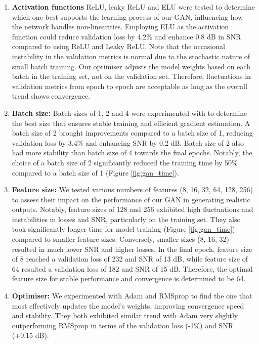 \begin{enumerate}
	\item \textbf{Activation functions} ReLU, leaky ReLU and ELU were tested to determine which one best supports the learning process of our GAN, influencing how the network handles non-linearities. Employing ELU as the activation function could reduce validation loss by 4.2\% and enhance 0.8 dB in SNR compared to using ReLU and Leaky ReLU. Note that the occasional instability in the validation metrics is normal due to the stochastic nature of small batch training. Our optimiser adjusts the model weights based on each batch in the training set, not on the validation set. Therefore, fluctuations in validation metrics from epoch to epoch are acceptable as long as the overall trend shows convergence.
	
	\item \textbf{Batch size:} Batch sizes of 1, 2 and 4 were experimented with to determine the best size that ensures stable training and efficient gradient estimation. A batch size of 2 brought improvements compared to a batch size of 1, reducing validation loss by 3.4\% and enhancing SNR by 0.2 dB. Batch size of 2 also had more stability than batch size of 4 towards the final epochs. Notably, the choice of a batch size of 2 significantly reduced the training time by 50\% compared to a batch size of 1 (Figure \ref{fig:gan_time}). 
	
	\item \textbf{Feature size:} We tested various numbers of features (8, 16, 32, 64, 128, 256) to assess their impact on the performance of our GAN in generating realistic outputs. Notably, feature sizes of 128 and 256 exhibited high fluctuations and instabilities in losses and SNR, particularly on the training set. They also took significantly longer time for model training (Figure \ref{fig:gan_time}) compared to smaller feature sizes. Conversely, smaller sizes (8, 16, 32) resulted in much lower SNR and higher losses. In the final epoch, feature size of 8 reached a validation loss of 232 and SNR of 13 dB, while feature size of 64 resulted a validation loss of 182 and SNR of 15 dB. Therefore, the optimal feature size for stable performance and convergence is determined to be 64.
	
	\item \textbf{Optimiser:} We experimented with Adam and RMSprop to find the one that most effectively updates the model's weights, improving convergence speed and stability. They both exhibited similar trend with Adam very slightly outperforming RMSprop in terms of the validation loss (-1\%) and SNR (+0.15 dB).
	

\end{enumerate}
